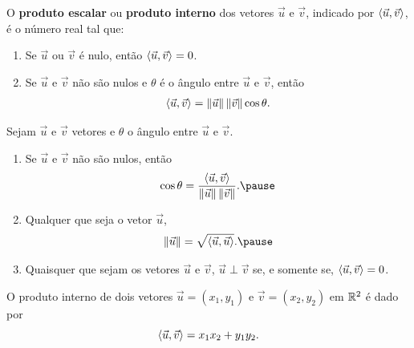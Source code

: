 \documentclass{beamer}
\begin{document}
\begin{frame}
    \begin{definicao}\label{produtointerno}
        O \textbf{produto escalar} \pause ou \textbf{produto interno} \pause dos vetores $\vec{u}$ e $\vec{v}$, \pause indicado por $\langle \vec{u}, \vec{v} \rangle$, \pause é o
        número real tal que:\pause
        \begin{enumerate}[label=({\roman*})]
            \item Se $\vec{u}$ ou $\vec{v}$ é nulo, \pause então $\langle \vec{u}, \vec{v} \rangle = 0$.\pause
            \item Se $\vec{u}$ e $\vec{v}$ não são nulos \pause e $\theta$ é o ângulo entre $\vec{u}$ e $\vec{v}$, \pause então\pause
                  \begin{align*}
                      \langle \vec{u}, \vec{v} \rangle = \left\Vert{\vec{u}}\right\Vert\left\Vert{\vec{v}}\right\Vert\cos\theta.
                  \end{align*}
        \end{enumerate}
    \end{definicao}
\end{frame}

\begin{frame}
    \begin{proposicao}
        Sejam $\vec{u}$ e $\vec{v}$ vetores \pause e $\theta$ o ângulo entre $\vec{u}$ e $\vec{v}$.\pause
        \begin{enumerate}[label=({\roman*})]
            \item Se $\vec{u}$ e $\vec{v}$ não são nulos, \pause então\pause
                  \[
                      \cos\theta = \dfrac{\inner{u}{v}}{\norm{\vec{u}}\norm{\vec{v}}}.\pause
                  \]
            \item Qualquer que seja o vetor $\vec{u}$,\pause
                  \[
                      \norm{\vec{u}} = \sqrt{\inner{u}{u}}.\pause
                  \]
            \item Quaisquer que sejam os vetores $\vec{u}$ e $\vec{v}$, \pause $\vec{u}\perp\vec{v}$ \pause se, e somente se, $\langle \vec{u}, \vec{v} \rangle = 0$.\pause
        \end{enumerate}
    \end{proposicao}
\end{frame}

\begin{frame}
    \begin{teorema}
        O produto interno de dois vetores $\vec{u} = (x_1, y_1)$ \pause e $\vec{v} = (x_2, y_2)$ \pause em $\mathbb{R}^2$ é dado por\pause
        \[
            \langle \vec{u}, \vec{v} \rangle = x_1x_2 + y_1y_2.
        \]
    \end{teorema}
\end{frame}
\end{document}
